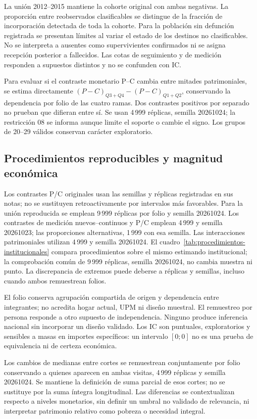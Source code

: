 La unión 2012--2015 mantiene la cohorte original con ambas negativas.
La proporción entre reobservados clasificables se distingue de la fracción
de incorporación detectada de toda la cohorte. Para la población sin defunción
registrada se presentan límites al variar el estado de los destinos no
clasificables. No se interpreta a ausentes como supervivientes confirmados ni
se asigna recepción posterior a fallecidos. Las cotas de seguimiento y de
medición responden a supuestos distintos y no se confunden con IC.

Para evaluar si el contraste monetario P--C cambia entre mitades patrimoniales,
se estima directamente $(P-C)_{Q3+Q4}-(P-C)_{Q1+Q2}$, conservando la dependencia
por folio de las cuatro ramas. Dos contrastes positivos por separado no prueban
que difieran entre sí. Se usan 4\,999 réplicas, semilla 20261024; la restricción
08 se informa aunque limite el soporte o cambie el signo. Los grupos de 20--29
válidos conservan carácter exploratorio.

\subsection{Procedimientos reproducibles y magnitud económica}

Los contrastes P/C originales usan las semillas y réplicas registradas en sus
notas; no se sustituyen retroactivamente por intervalos más favorables. Para
la unión reproducida se emplean 9\,999 réplicas por folio y semilla 20261024.
Los contrastes de medición nuevos--continuos y P/C emplean 4\,999 y semilla
20261023; las proporciones alternativas, 1\,999 con esa semilla. Las
interacciones patrimoniales utilizan 4\,999 y semilla 20261024. El
cuadro~\ref{tab:procedimientos-institucionales} compara procedimientos sobre
el mismo estimando institucional; la comprobación común de 9\,999 réplicas,
semilla 20261024, no cambia muestra ni punto. La discrepancia de extremos
puede deberse a réplicas y semillas, incluso cuando ambos remuestrean folios.

El folio conserva agrupación compartida de origen y dependencia entre
integrantes; no acredita hogar actual, UPM ni diseño muestral. El remuestreo
por persona responde a otro supuesto de independencia. Ninguno produce
inferencia nacional sin incorporar un diseño validado. Los IC son puntuales,
exploratorios y sensibles a masas en importes específicos: un intervalo
$[0;0]$ no es una prueba de equivalencia ni de certeza económica.

Los cambios de medianas entre cortes se remuestrean conjuntamente por folio
conservando a quienes aparecen en ambas visitas, 4\,999 réplicas y semilla
20261024. Se mantiene la definición de suma parcial de esos cortes; no se
sustituye por la suma íntegra longitudinal. Las diferencias se contextualizan
respecto a niveles monetarios, sin definir un umbral no validado de relevancia,
ni interpretar patrimonio relativo como pobreza o necesidad integral.

